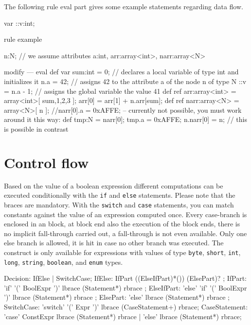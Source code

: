 \begin{example}
The following rule eval part gives some example statements regarding data flow.
  \begin{grgen}
var ::v:int;
	
rule example
{
  n:N; // we assume attributes a:int, arr:array<int>, narr:array<N>
	
	modify {
	---
		eval {
			def var sum:int = 0; // declares a local variable of type int and initializes it
			n.a = 42; // assigns 42 to the attribute a of the node n of type N
			::v = n.a - 1; // assigns the global variable the value 41
			def ref arr:array<int> = array<int>[ sum,1,2,3 ];
			arr[0] = arr[1] + n.arr[sum];
			def ref narr:array<N> = array<N>[ n ];
			//narr[0].a = 0xAFFE; -- currently not possible, you must work around it this way:
			def tmp:N = narr[0];
			tmp.a = 0xAFFE;
			n.narr[0] = n; // this is possible in contrast
		}
	}
}
  \end{grgen}
\end{example}


\section{Control flow} \label{sub:controlflow}

Based on the value of a boolean expression different computations can be executed conditionally with the \texttt{if} and \texttt{else} statements. 
Please note that the braces are mandatory.
With the \texttt{switch} and \texttt{case} statements, you can match constants against the value of an expression computed once.
Every case-branch is enclosed in an block, at block end also the execution of the block ends,
there is no implicit fall-through carried out, a fall-through is not even available.
Only one else branch is allowed, it is hit in case no other branch was executed.
The construct is only available for expressions with values of type \texttt{byte}, \texttt{short}, \texttt{int}, \texttt{long}, \texttt{string}, \texttt{boolean}, and \texttt{enum} types.

\begin{rail} 
  Decision: IfElse | SwitchCase;
  IfElse: IfPart ((ElseIfPart)*()) (ElsePart)? ;
	IfPart: 'if' '(' BoolExpr ')' lbrace (Statement*) rbrace ;
	ElseIfPart: 'else' 'if' '(' BoolExpr ')' lbrace (Statement*) rbrace ;
	ElsePart: 'else' lbrace (Statement*) rbrace ;
	SwitchCase: 'switch' '(' Expr ')' lbrace (CaseStatement+) rbrace;
	CaseStatement: 'case' ConstExpr lbrace (Statement*) rbrace | 'else' lbrace (Statement*) rbrace;
\end{rail}

